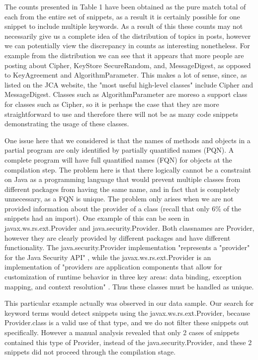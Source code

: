 \documentclass[10pt, conference]{IEEEtran}
\begin{document}
The counts presented in Table 1 have been obtained as the pure match total of each from the entire set of snippets, as a result it is certainly possible for one snippet to include multiple keywords. As a result of this these counts may not necessarily give us a complete idea of the distribution of topics in posts, however we can potentially view the discrepancy in counts as interesting nonetheless. For example from the distribution we can see that it appears that more people are posting about Cipher, KeyStore SecureRandom, and, MessageDigest, as opposed to KeyAgreement and AlgorithmParameter. This makes a lot of sense, since, as listed on the JCA website, the "most useful high-level classes" include Cipher and MessageDigest. Classes such as AlgorithmParameter are moreso a support class for classes such as Cipher, so it is perhaps the case that they are more straightforward to use and therefore there will not be as many code snippets demonstrating the usage of these classes.
 

One issue here that we considered is that the names of methods and objects in a partial program are only identified by partially quantified names (PQN). A complete program will have full quantified names (FQN) for objects at the compilation step. The problem here is that there logically cannot be a constraint on Java as a programming language that would prevent multiple classes from different packages from having the same name, and in fact that is completely unnecessary, as a FQN is unique. The problem only arises when we are not provided information about the provider of a class (recall that only 6\% of the snippets had an import). One example of this can be seen in javax.ws.rs.ext.Provider and java.security.Provider. Both classnames are Provider, however they are clearly provided by different packages and have different functionality. The java.security.Provider implementation "represents a "provider" for the Java Security API" \cite{Security.Provider}, while the javax.ws.rs.ext.Provider is an implementation of "providers are application components that allow for customization of runtime behavior in three key areas: data binding, exception mapping, and context resolution" \cite{jax.Provider}. Thus these classes must be handled as unique. 

This particular example actually was observed in our data sample. Our search for keyword terms would detect snippets using the javax.ws.rs.ext.Provider, because Provider.class is a valid use of that type, and we do not filter these snippets out specifically. However a manual analysis revealed that only 2 cases of snippets contained this type of Provider, instead of the java.security.Provider, and these 2 snippets did not proceed through the compilation stage.
\end{document}
